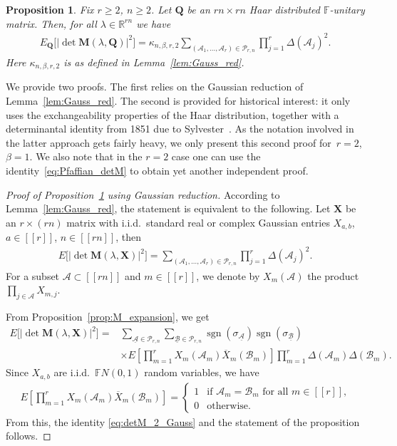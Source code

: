 \documentclass[pdftex]{sigma}
\numberwithin{equation}{section}
\newtheorem{Proposition}[Theorem]{Proposition}
\theoremstyle{definition}
\newcommand{\FF}{{\mathbb{F}}}
\newcommand{\R}{{\mathbb R}}
\newcommand{\cP}{{\mathcal P}}
\newcommand{\cB}{\mathcal{B}}
\newcommand{\sgn}{\operatorname{sgn}}
\newcommand{\cA}{\mathcal{A}}
\newcommand{\lst}[1]{[\![#1 ]\!]}
\newcommand{\mbf}[1]{\mathbf{#1}}
\begin{document}
\begin{Proposition}\label{prop:det_l=2}
Fix $r\ge 2$, $n\ge 2$. Let $\mbf{Q}$ be an $rn\times rn$ Haar distributed $\mathbb{F}$-unitary matrix.
Then, for all ${\lambda}\in \R^{rn}$ we have
 \begin{align*}%
 E_{\boldsymbol{Q}} \big[|{\det \mbf{M}(
 {\lambda}, \mbf{Q})}|^2\big] = \kappa_{n,\beta, r,2} \sum_{(\cA_1,\dots, \cA_r)\in \cP_{r,n}} \prod_{j=1}^r \Delta
 (\cA_j)^2.
 \end{align*}
Here $\kappa_{n,\beta,r,2}$ is as defined in Lemma~{\rm\ref{lem:Gauss_red}}.
\end{Proposition}

We provide two proofs. The first relies on the Gaussian reduction of Lemma~\ref{lem:Gauss_red}. The second is provided for historical interest: it only uses the exchangeability properties of the Haar distribution, together with a determinantal identity from 1851 due to Sylvester~\cite{Sylvester1851}.
As the notation involved in the latter approach gets fairly heavy, we only present this second proof for~$r=2$, $\beta =1$. We also note that in the $r=2$ case one can use the identity~\eqref{eq:Pfaffian_detM} to obtain yet another independent proof.

\begin{proof}[Proof of Proposition~\ref{prop:det_l=2} using Gaussian reduction]
According to Lemma~\ref{lem:Gauss_red}, the statement is equivalent to the following.
 Let $\mbf{X}$ be an $r\times (rn)$ matrix with i.i.d.~standard real or complex Gaussian entries $X_{a,b}$, $ a\in\lst{r}$, $n\in \lst{rn}$, then
\begin{align}\label{eq:detM_2_Gauss}
 E \big[|{\det \mbf{M}({\lambda}, \mbf{X})}|^2\big] = \sum_{(\cA_1,\dots, \cA_r)\in \cP_{r,n}} \prod_{j=1}^r \Delta(\cA_j)^2.
 \end{align}
For a subset $\cA\subset \lst{rn}$ and $m\in \lst{r}$, we denote by $X_{m}(\cA)$ the product $\prod_{j\in \cA} X_{m,j}$.


From Proposition~\ref{prop:M_expansion}, we get
\begin{align*}
 E\big[|{\det \mbf{M}(\lambda, \mbf{X})}|^2\big]={}&\sum_{\underline{\cA}\in \cP_{r,n}}\sum_{\underline{\cB}\in \cP_{r,n}}\sgn(\sigma_{\underline{\cA}})\sgn(\sigma_{\underline{\cB}}) \\
 & \times E\left[\prod_{m=1}^r X_{m}(\cA_m) \overline{X}_{m}(\cB_m)\right]
\prod_{m=1}^r \Delta(\cA_m) \Delta(\cB_m).
\end{align*}
Since $X_{a,b}$ are i.i.d.~$\FF N(0,1)$ random variables, we have
\begin{align*}
 E\left[\prod_{m=1}^r X_{m}(\cA_m) \overline{X}_{m}(\cB_m)\right] =\begin{cases}
1 &\text{if $\cA_m=\cB_m$ for all $m\in \lst{r}$,}\\
0 &\text{otherwise.}
 \end{cases}
\end{align*}
From this, the identity \eqref{eq:detM_2_Gauss} and the statement of the proposition follows.
\end{proof}
\end{document}
